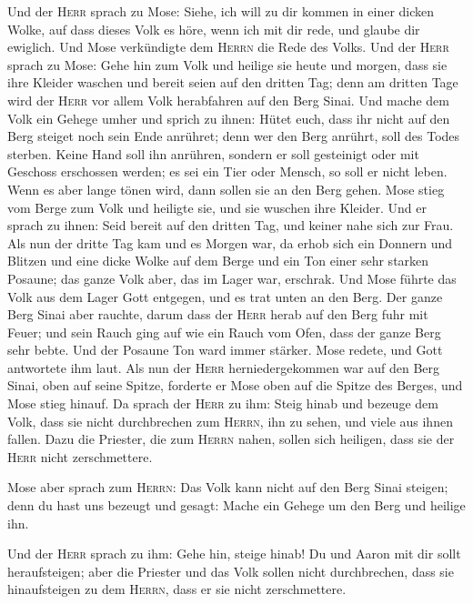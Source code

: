  Und der \textsc{Herr} sprach zu Mose: Siehe, ich will zu
dir kommen in einer dicken Wolke, auf dass dieses Volk es höre, wenn ich
mit dir rede, und glaube dir ewiglich. Und Mose verkündigte dem
\textsc{Herrn} die Rede des Volks.  Und der \textsc{Herr}
sprach zu Mose: Gehe hin zum Volk und heilige sie heute und morgen, dass
sie ihre Kleider waschen  und bereit seien auf den
dritten Tag; denn am dritten Tage wird der \textsc{Herr} vor allem Volk
herabfahren auf den Berg Sinai.  Und mache dem Volk ein
Gehege umher und sprich zu ihnen: Hütet euch, dass ihr nicht auf den
Berg steiget noch sein Ende anrühret; denn wer den Berg anrührt, soll
des Todes sterben.  Keine Hand soll ihn anrühren, sondern
er soll gesteinigt oder mit Geschoss erschossen werden; es sei ein Tier
oder Mensch, so soll er nicht leben. Wenn es aber lange tönen wird, dann
sollen sie an den Berg gehen.  Mose stieg vom Berge zum
Volk und heiligte sie, und sie wuschen ihre Kleider.  Und
er sprach zu ihnen: Seid bereit auf den dritten Tag, und keiner nahe
sich zur Frau.  Als nun der dritte Tag kam und es Morgen
war, da erhob sich ein Donnern und Blitzen und eine dicke Wolke auf dem
Berge und ein Ton einer sehr starken Posaune; das ganze Volk aber, das
im Lager war, erschrak.  Und Mose führte das Volk aus dem
Lager Gott entgegen, und es trat unten an den Berg.  Der
ganze Berg Sinai aber rauchte, darum dass der \textsc{Herr} herab auf
den Berg fuhr mit Feuer; und sein Rauch ging auf wie ein Rauch vom Ofen,
dass der ganze Berg sehr bebte.  Und der Posaune Ton ward
immer stärker. Mose redete, und Gott antwortete ihm laut.
 Als nun der \textsc{Herr} herniedergekommen war auf den
Berg Sinai, oben auf seine Spitze, forderte er Mose oben auf die Spitze
des Berges, und Mose stieg hinauf.  Da sprach der
\textsc{Herr} zu ihm: Steig hinab und bezeuge dem Volk, dass sie nicht
durchbrechen zum \textsc{Herrn}, ihn zu sehen, und viele aus ihnen
fallen.  Dazu die Priester, die zum \textsc{Herrn} nahen,
sollen sich heiligen, dass sie der \textsc{Herr} nicht zerschmettere.

 Mose aber sprach zum \textsc{Herrn}: Das Volk kann nicht
auf den Berg Sinai steigen; denn du hast uns bezeugt und gesagt: Mache
ein Gehege um den Berg und heilige ihn.

 Und der \textsc{Herr} sprach zu ihm: Gehe hin, steige
hinab! Du und Aaron mit dir sollt heraufsteigen; aber die Priester und
das Volk sollen nicht durchbrechen, dass sie hinaufsteigen zu dem
\textsc{Herrn}, dass er sie nicht zerschmettere.

